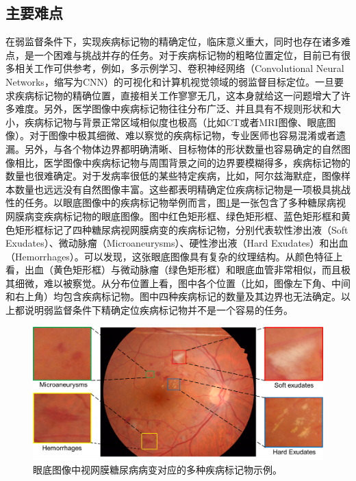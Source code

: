 \subsection{主要难点}
在弱监督条件下，实现疾病标记物的精确定位，临床意义重大，同时也存在诸多难点，是一个困难与挑战并存的任务。对于疾病标记物的粗略位置定位，目前已有很多相关工作可供参考，例如，多示例学习、卷积神经网络（Convolutional Neural Networks，缩写为CNN）的可视化和计算机视觉领域的弱监督目标定位。一旦要求疾病标记物的精确位置，直接相关工作寥寥无几，这本身就给这一问题增大了许多难度。另外，医学图像中疾病标记物往往分布广泛、并且具有不规则形状和大小，疾病标记物与背景正常区域相似度也极高（比如CT或者MRI图像、眼底图像）。对于图像中极其细微、难以察觉的疾病标记物，专业医师也容易混淆或者遗漏。另外，与各个物体边界都明确清晰、目标物体的形状数量也容易确定的自然图像相比，医学图像中疾病标记物与周围背景之间的边界要模糊得多，疾病标记物的数量也很难确定。对于发病率很低的某些特定疾病，比如，阿尔兹海默症，图像样本数量也远远没有自然图像丰富。这些都表明精确定位疾病标记物是一项极具挑战性的任务。以眼底图像中的疾病标记物举例而言，图\ref{fig:biomarker_localization_example}是一张包含了多种糖尿病视网膜病变疾病标记物的眼底图像。图中红色矩形框、绿色矩形框、蓝色矩形框和黄色矩形框标记了四种糖尿病视网膜病变的疾病标记物，分别代表软性渗出液（Soft Exudates）、微动脉瘤（Microaneurysms）、硬性渗出液（Hard Exudates）和出血（Hemorrhages）。可以发现，这张眼底图像具有复杂的纹理结构。从颜色特征上看，出血（黄色矩形框）与微动脉瘤（绿色矩形框）和眼底血管非常相似，而且极其细微，难以被察觉。从分布位置上看，图中各个位置（比如，图像左下角、中间和右上角）均包含疾病标记物。图中四种疾病标记的数量及其边界也无法确定。以上都说明弱监督条件下精确定位疾病标记物并不是一个容易的任务。
\begin{figure}[h!]
	\centering
	\includegraphics[width=1.0\textwidth]{figure/biomarker_localization_example}
	\caption[眼底图像中视网膜糖尿病病变对应的多种疾病标记物示例]{眼底图像中视网膜糖尿病病变对应的多种疾病标记物示例。} 
	\label{fig:biomarker_localization_example}
\end{figure}


